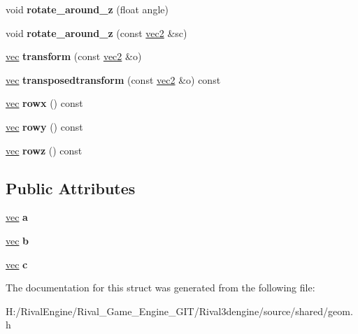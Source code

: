 \begin{DoxyCompactItemize}
void {\bfseries rotate\+\_\+around\+\_\+z} (float angle)
\item 
\mbox{\label{structmatrix3_a1c96c8a5f7ffb9af8c34bd5b3025e171}} 
void {\bfseries rotate\+\_\+around\+\_\+z} (const \hyperlink{structvec2}{vec2} \&sc)
\item 
\mbox{\label{structmatrix3_a186cca4edc595931f87b75f8f9ef0490}} 
\hyperlink{structvec}{vec} {\bfseries transform} (const \hyperlink{structvec2}{vec2} \&o)
\item 
\mbox{\label{structmatrix3_a913fd35c7f822140a5e00169c9c2e831}} 
\hyperlink{structvec}{vec} {\bfseries transposedtransform} (const \hyperlink{structvec2}{vec2} \&o) const
\item 
\mbox{\label{structmatrix3_a2c6c8150a74fbeaf6cf3615af182124c}} 
\hyperlink{structvec}{vec} {\bfseries rowx} () const
\item 
\mbox{\label{structmatrix3_af98b0332aaed09449051de82c4c76367}} 
\hyperlink{structvec}{vec} {\bfseries rowy} () const
\item 
\mbox{\label{structmatrix3_aa8b1d1ca48d9aa8660951e6eeda9da90}} 
\hyperlink{structvec}{vec} {\bfseries rowz} () const
\end{DoxyCompactItemize}
\subsection*{Public Attributes}
\begin{DoxyCompactItemize}
\item 
\mbox{\label{structmatrix3_a3597c00642f3b504118ae7d4464e2372}} 
\hyperlink{structvec}{vec} {\bfseries a}
\item 
\mbox{\label{structmatrix3_a36b43e309c3c191ea432912b841cf987}} 
\hyperlink{structvec}{vec} {\bfseries b}
\item 
\mbox{\label{structmatrix3_aa2a45dd006b7ffc3d267e3b35f47b984}} 
\hyperlink{structvec}{vec} {\bfseries c}
\end{DoxyCompactItemize}


The documentation for this struct was generated from the following file\+:\begin{DoxyCompactItemize}
\item 
H\+:/\+Rival\+Engine/\+Rival\+\_\+\+Game\+\_\+\+Engine\+\_\+\+G\+I\+T/\+Rival3dengine/source/shared/geom.\+h\end{DoxyCompactItemize}
